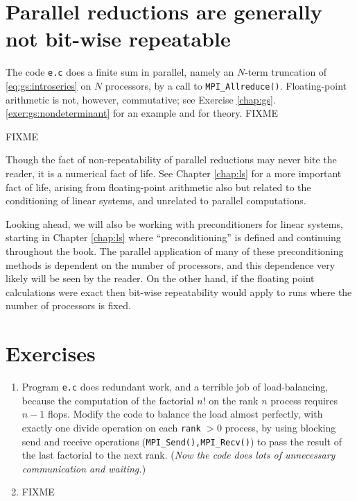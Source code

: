 \section{Parallel reductions are generally not bit-wise repeatable}

The code \texttt{e.c} does a finite sum in parallel, namely an $N$-term truncation of \eqref{eq:gs:introseries} on  $N$ processors, by a call to \texttt{MPI\_Allreduce()}.  Floating-point arithmetic is not, however, commutative; see Exercise \ref{chap:gs}.\ref{exer:gs:nondeterminant} for an example and \citep{Higham2002,TrefethenBau1997} for theory. FIXME


FIXME

Though the fact of non-repeatability of parallel reductions may never bite the reader, it is a numerical fact of life.  See Chapter \ref{chap:ls} for a more important fact of life, arising from floating-point arithmetic also but related to the conditioning of linear systems, and unrelated to parallel computations.

Looking ahead, we will also be working with preconditioners for linear systems, starting in Chapter \ref{chap:ls} where ``preconditioning'' is defined and continuing throughout the book.  The parallel application of many of these preconditioning methods is dependent on the number of processors, and this dependence very likely will be seen by the reader.  On the other hand, if the floating point calculations were exact then bit-wise repeatability would apply to runs where the number of processors is fixed.


\bigskip
\section{Exercises}

\renewcommand{\labelenumi}{\arabic{chapter}.\arabic{enumi}\quad}
\begin{enumerate}

\item \label{exer:gs:balance} Program \texttt{e.c} does redundant work, and a terrible job of load-balancing, because the computation of the factorial $n!$ on the rank $n$ process requires $n-1$ flops.  Modify the code to balance the load almost perfectly, with exactly one divide operation on each \texttt{rank} $>0$ process, by using blocking send and receive operations (\texttt{MPI\_Send(),MPI\_Recv()}) to pass the result of the last factorial to the next rank.  (\emph{Now the code does lots of unnecessary communication and waiting.})

\item \label{exer:gs:nondeterminant} FIXME

\end{enumerate}
